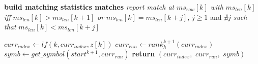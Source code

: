 \documentclass[a4paper,12pt, oneside]{book}
\begin{document}
\begin{algorithm}
\begin{algorithmic}[1]
    \For{\textit{every} $k\in[0,|ms_{row}|)$}
    \Comment \textbf{build matching statistics matches}
    \State \textit{report match at} $ms_{row}[k]$ \textit{with} $ms_{len}[k]$
    \textit{iff} $ms_{len}[k]> ms_{len}[k+1]$
    \State \textit{or} $ms_{len}[k]= ms_{len}[k+j]$, $j\geq 1$ and $\nexists j$
    \textit{such that}  $ms_{len}[k]< ms_{len}[k+j]$
    \EndFor
    \EndFunction
    
  \end{algorithmic}
  \caption{Algoritmo per match con matching-statistics (MS) e LCE}
\end{algorithm}
\begin{algorithm}
  \begin{algorithmic}[1]
    \State $curr_{index}\gets lf(k, curr_{index}, z[k])$
    \State $curr_{run}\gets rank_h^{k+1}(curr_{index})$
    \State $symb\gets get\_symbol(start^{k+1}, curr_{run})$
    \State \textbf{return} $(curr_{index},\,\,curr_{run},\,\,symb)$
    \EndFunction
  \end{algorithmic}
  \caption{Algoritmo per l'update usando le matching statistics} 
\end{algorithm}
\end{document}
